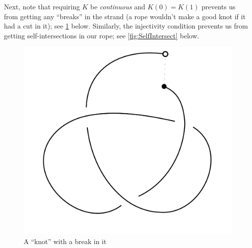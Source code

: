Next, note that requiring $K$ be \emph{continuous} and $K(0) = K(1)$
prevents us from getting any ``breaks'' in the strand (a rope wouldn't
make a good knot if it had a cut in it); see \cref{fig:KnotBreak}
below. Similarly, the injectivity condition prevents us from getting
self-intersections in our rope; see
\cref{fig:SelfIntersect} below.\\
\begin{minipage}{.49\linewidth}
  \begin{figure}[H]
    \centering
    \includegraphics[scale=.15]{figures/background/broken-trefoil.pdf}
    \caption{A ``knot'' with a break in it}
    \label{fig:KnotBreak}
  \end{figure}
\end{minipage}
